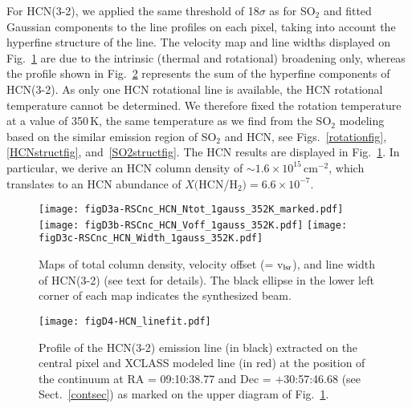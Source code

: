 \documentclass{aa}
\begin{document}
\begin{appendix}
For HCN(3-2), we applied the same threshold of 18$\sigma$ as for
SO$_2$ and fitted Gaussian components to the line profiles on each
pixel, taking into account the hyperfine structure of the line. The
velocity map and line widths displayed on Fig.~\ref{fig:hcn_xclass}
are due to the intrinsic (thermal and rotational) broadening only,
whereas the profile shown in Fig.~\ref{fig:hcnlineft_xclass}
represents the sum of the hyperfine components of HCN(3-2). As only
one HCN rotational line is available, the HCN rotational temperature
cannot be determined. We therefore fixed the rotation temperature at a
value of 350\,K, the same temperature as we find from the SO$_2$
modeling\, based on the similar emission region of SO$_2$ and HCN, see
Figs.~\ref{rotationfig},  \ref{HCNstructfig},
and~\ref{SO2structfig}. The HCN results are displayed in
Fig.~\ref{fig:hcn_xclass}. In particular, we derive an HCN column
density of $\sim 1.6 \times 10^{15}$\,cm$^{-2}$, which translates to
an HCN abundance of $X($HCN/H$_2) = 6.6\times10^{-7}$.

\begin{figure}[h!]
\texttt{[image: figD3a-RSCnc\_HCN\_Ntot\_1gauss\_352K\_marked.pdf]}
\texttt{[image: figD3b-RSCnc\_HCN\_Voff\_1gauss\_352K.pdf]}
\texttt{[image: figD3c-RSCnc\_HCN\_Width\_1gauss\_352K.pdf]}
 \caption{Maps of total column density, velocity offset (= v$_{\rm
          lsr}$), and line width of HCN(3-2) (see text for details). 
          The black ellipse in the lower left corner of each map 
          indicates the synthesized beam.}
\label{fig:hcn_xclass} 
\end{figure}

\begin{figure}[h!]
\texttt{[image: figD4-HCN\_linefit.pdf]}

\caption{Profile of the HCN(3-2) emission line (in black)  extracted
         on the central pixel and XCLASS modeled  line (in red) at 
         the position of the continuum at  RA = 09:10:38.77 and 
         Dec = $+$30:57:46.68 (see Sect.~\ref{contsec}) as marked on 
         the upper diagram of Fig.~\ref{fig:hcn_xclass}.}
\label{fig:hcnlineft_xclass} 
\end{figure}

\end{appendix}
\end{document}
